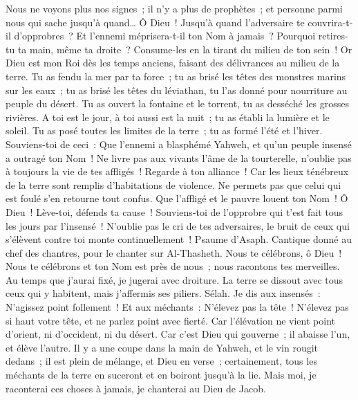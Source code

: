 \begin{multicols}{2}
Nous ne voyons plus nos signes~; il n'y a plus de prophètes~; et personne parmi nous qui sache jusqu'à quand…
Ô Dieu~! Jusqu'à quand l'adversaire te couvrira-t-il d'opprobres~? Et l'ennemi méprisera-t-il ton Nom à jamais~?
Pourquoi retires-tu ta main, même ta droite~? Consume-les en la tirant du milieu de ton sein~!
Or Dieu est mon Roi dès les temps anciens, faisant des délivrances au milieu de la terre.
Tu as fendu la mer par ta force~; tu as brisé les têtes des monstres marins sur les eaux~;
tu as brisé les têtes du léviathan, tu l'as donné pour nourriture au peuple du désert.
Tu as ouvert la fontaine et le torrent, tu as desséché les grosses rivières.
A toi est le jour, à toi aussi est la nuit~; tu as établi la lumière et le soleil.
Tu as posé toutes les limites de la terre~; tu as formé l'été et l'hiver.
Souviens-toi de ceci~: Que l'ennemi a blasphémé Yahweh, et qu'un peuple insensé a outragé ton Nom~!
Ne livre pas aux vivants l'âme de la tourterelle, n'oublie pas à toujours la vie de tes affligés~!
Regarde à ton alliance~! Car les lieux ténébreux de la terre sont remplis d'habitations de violence.
Ne permets pas que celui qui est foulé s'en retourne tout confus. Que l'affligé et le pauvre louent ton Nom~!
Ô Dieu~! Lève-toi, défends ta cause~! Souviens-toi de l'opprobre qui t'est fait tous les jours par l'insensé~!
N'oublie pas le cri de tes adversaires, le bruit de ceux qui s'élèvent contre toi monte continuellement~!
\VerseOne{}Psaume d'Asaph. Cantique donné au chef des chantres, pour le chanter sur Al-Thasheth.
Nous te célébrons, ô Dieu~! Nous te célébrons et ton Nom est près de nous~; nous racontons tes merveilles.
Au temps que j'aurai fixé, je jugerai avec droiture.
La terre se dissout avec tous ceux qui y habitent, mais j'affermis ses piliers. Sélah.
Je dis aux insensés~: N'agissez point follement~! Et aux méchants~: N'élevez pas la tête~!
N'élevez pas si haut votre tête, et ne parlez point avec fierté.
Car l'élévation ne vient point d'orient, ni d'occident, ni du désert.
Car c'est Dieu qui gouverne~; il abaisse l'un, et élève l'autre.
Il y a une coupe dans la main de Yahweh, et le vin rougit dedans~; il est plein de mélange, et Dieu en verse~; certainement, tous les méchants de la terre en suceront et en boiront jusqu'à la lie.
Mais moi, je raconterai ces choses à jamais, je chanterai au Dieu de Jacob.

\end{multicols}
